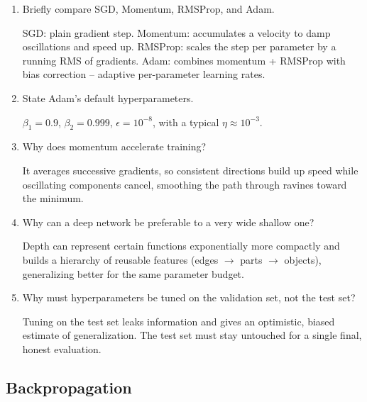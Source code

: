 \documentclass[10pt,a4paper]{article}
\newcommand{\q}[1]{\item #1}
\begin{document}
\begin{enumerate}[leftmargin=*,label=\textbf{Q\arabic*.}]

\q Briefly compare SGD, Momentum, RMSProp, and Adam.
\begin{answerbox}
SGD: plain gradient step. Momentum: accumulates a velocity to damp oscillations and speed up. RMSProp: scales the step per parameter by a running RMS of gradients. Adam: combines momentum + RMSProp with bias correction -- adaptive per-parameter learning rates.
\end{answerbox}

\q State Adam's default hyperparameters.
\begin{answerbox}
$\beta_1 = 0.9$, $\beta_2 = 0.999$, $\epsilon = 10^{-8}$, with a typical $\eta \approx 10^{-3}$.
\end{answerbox}

\q Why does momentum accelerate training?
\begin{answerbox}
It averages successive gradients, so consistent directions build up speed while oscillating components cancel, smoothing the path through ravines toward the minimum.
\end{answerbox}

\q Why can a deep network be preferable to a very wide shallow one?
\begin{answerbox}
Depth can represent certain functions exponentially more compactly and builds a hierarchy of reusable features (edges $\to$ parts $\to$ objects), generalizing better for the same parameter budget.
\end{answerbox}

\q Why must hyperparameters be tuned on the validation set, not the test set?
\begin{answerbox}
Tuning on the test set leaks information and gives an optimistic, biased estimate of generalization. The test set must stay untouched for a single final, honest evaluation.
\end{answerbox}

\end{enumerate}

\subsection{Backpropagation}
\end{document}
